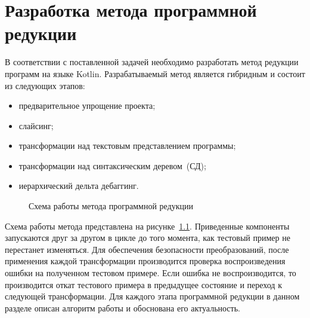 \chapter{Разработка метода программной редукции}
В соответствии с поставленной задачей необходимо разработать метод редукции программ на языке Kotlin.
Разрабатываемый метод является гибридным и состоит из следующих этапов: 
\begin{itemize}
	\item предварительное упрощение проекта;
	\item слайсинг;
	\item трансформации над текстовым представлением программы;
	\item трансформации над синтаксическим деревом~(СД);
	\item иерархический дельта дебаггинг.
\end{itemize}

\begin{figure}
\caption{\label{scheme}Схема работы метода программной редукции}
\end{figure}
Схема работы метода представлена на рисунке~\ref{scheme}. Приведенные компоненты запускаются друг за другом в цикле до того момента, как тестовый пример не перестанет изменяться. Для обеспечения безопасности преобразований, после применения каждой трансформации производится проверка воспроизведения ошибки на полученном тестовом примере. Если ошибка не воспроизводится, то производится откат тестового примера в предыдущее состояние и переход к следующей трансформации.
Для каждого этапа программной редукции в данном разделе описан алгоритм работы и обоснована его актуальность.

